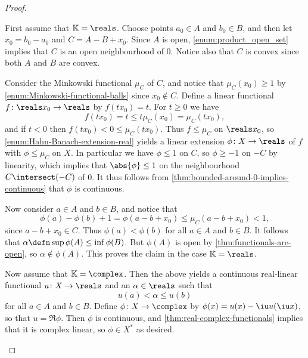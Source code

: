 \documentclass[article, a4paper, 11pt, oneside]{memoir}
\numberwithin{equation}{chapter}
\begin{document}
\begin{proof}
\begin{proofsec}
    \item[Proof of \subcref{enum:Hahn-Banach-separation-open}]
    First assume that $\field = \reals$. Choose points $a_0 \in A$ and $b_0 \in B$, and then let $x_0 = b_0 - a_0$ and $C = A - B + x_0$. Since $A$ is open, \cref{enum:product_open_set} implies that $C$ is an open neighbourhood of $0$. Notice also that $C$ is convex since both $A$ and $B$ are convex.
    
    Consider the Minkowski functional $\mu_C$ of $C$, and notice that $\mu_C(x_0) \geq 1$ by \cref{enum:Minkowski-functional-balls} since $x_0 \not\in C$. Define a linear functional $f \colon \reals x_0 \to \reals$ by $f(tx_0) = t$. For $t \geq 0$ we have
    \begin{equation*}
        f(tx_0)
            = t
            \leq t\mu_C(x_0)
            = \mu_C(tx_0),
    \end{equation*}
    and if $t < 0$ then $f(tx_0) < 0 \leq \mu_C(tx_0)$. Thus $f \leq \mu_C$ on $\reals x_0$, so \cref{enum:Hahn-Banach-extension-real} yields a linear extension $\phi \colon X \to \reals$ of $f$ with $\phi \leq \mu_C$ on $X$. In particular we have $\phi \leq 1$ on $C$, so $\phi \geq -1$ on $-C$ by linearity, which implies that $\abs{\phi} \leq 1$ on the neighbourhood $C \intersect (-C)$ of $0$. It thus follows from \cref{thm:bounded-around-0-implies-continuous} that $\phi$ is continuous.

    Now consider $a \in A$ and $b \in B$, and notice that
    \begin{equation*}
        \phi(a) - \phi(b) + 1
            = \phi(a - b + x_0)
            \leq \mu_C(a - b + x_0)
            < 1,
    \end{equation*}
    since $a - b + x_0 \in C$. Thus $\phi(a) < \phi(b)$ for all $a \in A$ and $b \in B$. It follows that $\alpha \defn \sup \phi(A) \leq \inf \phi(B)$. But $\phi(A)$ is open by \cref{thm:functionals-are-open}, so $\alpha \not\in \phi(A)$. This proves the claim in the case $\field = \reals$.

    Now assume that $\field = \complex$. Then the above yields a continuous real-linear functional $u \colon X \to \reals$ and an $\alpha \in \reals$ such that
    \begin{equation*}
        u(a)
            < \alpha
            \leq u(b)
    \end{equation*}
    for all $a \in A$ and $b \in B$. Define $\phi \colon X \to \complex$ by $\phi(x) = u(x) - \iu u(\iu x)$, so that $u = \Re \phi$. Then $\phi$ is continuous, and \cref{thm:real-complex-functionals} implies that it is complex linear, so $\phi \in X^*$ as desired.


\end{proofsec}
\end{proof}
\end{document}
